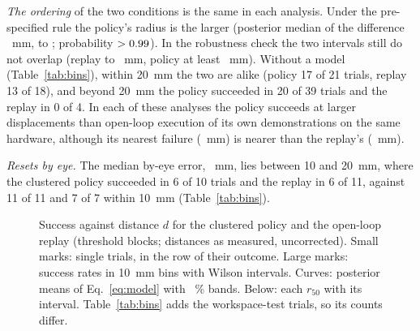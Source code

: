 \emph{The ordering} of the two conditions is the same in each analysis. Under the pre-specified rule the policy's radius is the larger (posterior median of the difference \radiusDiffClusteredReplay~mm, \radiusDiffClusteredReplayLow to \radiusDiffClusteredReplayHigh; probability $>0.99$). In the robustness check the two intervals still do not overlap (replay \radiusReplayWideLow to \radiusReplayWideHigh~mm, policy at least \radiusClusteredThresholdWideLow~mm). Without a model (Table~\ref{tab:bins}), within 20~mm the two are alike (policy 17 of 21 trials, replay 13 of 18), and beyond 20~mm the policy succeeded in 20 of 39 trials and the replay in 0 of 4. %
In each of these analyses the policy succeeds at larger displacements than open-loop execution of its own demonstrations on the same hardware, although its nearest failure (\minFailureDistClustered~mm) is nearer than the replay's (\minFailureDistReplay~mm).

\emph{Resets by eye.}
The median by-eye error, \byEyeErrorMedian~mm, lies between 10 and 20~mm, where the clustered policy succeeded in 6 of 10 trials and the replay in 6 of 11, against 11 of 11 and 7 of 7 within 10~mm (Table~\ref{tab:bins}). %

\begin{figure}[t]
\centering
{}
\caption{Success against distance $d$ for the clustered policy and the open-loop replay (threshold blocks; distances as measured, uncorrected). Small marks: single trials, in the row of their outcome. Large marks: success rates in 10~mm bins with Wilson intervals. Curves: posterior means of Eq.~\eqref{eq:model} with \intervalLevel~\% bands. Below: each $r_{50}$ with its interval. Table~\ref{tab:bins} adds the workspace-test trials, so its counts differ.} %
\label{fig:curves}
\end{figure}

